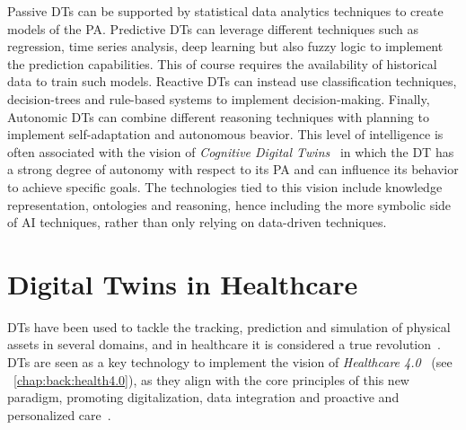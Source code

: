 Passive \acp{DT} can be supported by statistical data analytics techniques to create models of the \ac{PA}. 
%
Predictive \acp{DT} can leverage different techniques such as regression, time series analysis, deep learning but also fuzzy logic to implement the prediction capabilities. 
%
This of course requires the availability of historical data to train such models. 
%
Reactive \acp{DT} can instead use classification techniques, decision-trees and rule-based systems to implement decision-making. 
%
Finally, Autonomic \acp{DT} can combine different reasoning techniques with planning to implement self-adaptation and autonomous beavior.
%
This level of intelligence is often associated with the vision of \emph{Cognitive Digital Twins}~\cite{Zheng_Lu_Kiritsis_2022,Intizar_Ali_Patel_G_Breslin_Harik_Sheth_2021} in which the \ac{DT} has a strong degree of autonomy with respect to its \ac{PA} and can influence its behavior to achieve specific goals.
%
The technologies tied to this vision include knowledge representation, ontologies and reasoning, hence including the more symbolic side of \ac{AI} techniques, rather than only relying on data-driven techniques.

\section{Digital Twins in Healthcare}

\acp{DT} have been used to tackle the tracking, prediction and simulation of physical assets in several domains, and in healthcare it is considered a true revolution~\cite{Erol_Mendi_Doğan_2020}.
%
\acp{DT} are seen as a key technology to implement the vision of \emph{Healthcare 4.0}~\cite{Alazab_Khan_Koppu_Ramu_M_Boobalan_Baker_Maddikunta_Gadekallu_Aljuhani_2023} (see ~\ref{chap:back:health4.0}), as they align with the core principles of this new paradigm, promoting digitalization, data integration and proactive and personalized care~\cite{Björnsson_Borrebaeck_Elander_Gasslander_Gawel_Gustafsson_Jörnsten_Lee_Li_Lilja_et_al._2019}.

